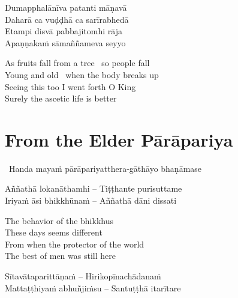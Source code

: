 \begin{verses}
  Dumapphalānīva patanti māṇavā\\
  Daharā ca vuḍḍhā ca sarīrabhedā\\
  Etampi disvā pabbajitomhi rāja\\
  Apaṇṇakaṁ sāmaññameva seyyo
\end{verses}

\begin{english-verses}
  As fruits fall from a tree \breathmark\ so people fall\\
  Young and old \breathmark\ when the body breaks up\\
  Seeing this too I went forth O King\\
  Surely the ascetic life is better
\end{english-verses}

\suttaRef{[Thag 16.4 / MN 82]}


\section{From the Elder Pārāpariya}
\label{parapariya}

\begin{leader}
  \anglebracketleft\ \hspace{-0.5mm}Handa mayaṁ pārāpariyatthera-gāthāyo bhaṇāmase \hspace{-0.5mm}\anglebracketright\
\end{leader}

\begin{verses}
  Aññathā lokanāthamhi – Tiṭṭhante purisuttame\\
  Iriyaṁ āsi bhikkhūnaṁ – Aññathā dāni dissati
\end{verses}

\begin{english-verses}
  The behavior of the bhikkhus\\
  These days seems different\\
  From when the protector of the world\\
  The best of men was still here
\end{english-verses}

\begin{verses}
  Sītavātaparittāṇaṁ – Hirikopīnachādanaṁ\\
  Mattaṭṭhiyaṁ abhuñjiṁsu – Santuṭṭhā itarītare
\end{verses}


